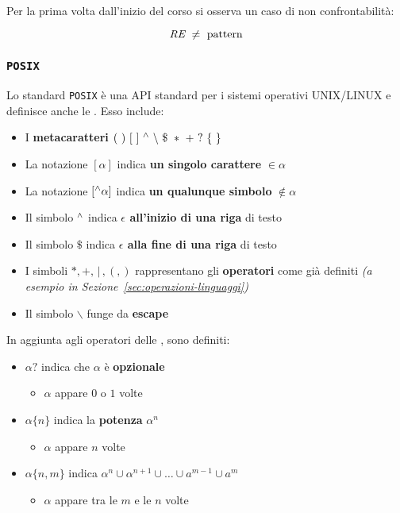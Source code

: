 \documentclass[italian, 10pt]{article}
\begin{document}
Per la prima volta dall'inizio del corso si osserva un caso di non confrontabilità:

\[ \textit{RE} \ \neq \text{ pattern} \]

\subsubsection{\RE \texttt{POSIX}}

Lo standard \texttt{POSIX} è una API standard per i sistemi operativi UNIX/LINUX e definisce anche le \RE.
Esso include:

\begin{itemize}
  \item I \textbf{metacaratteri} \(( \ ) \ [ \ ] \ \textsuperscript{$\wedge$} \ \backslash \ \$ \ \ast \ + \ ? \ \{ \ \}\)
  \item La notazione \([\alpha]\) indica \textbf{un singolo carattere} \(\in \alpha\)
  \item La notazione \([\textsuperscript{$\wedge$} \alpha]\) indica \textbf{un qualunque simbolo} \(\notin \alpha\)
  \item Il simbolo \(\textsuperscript{$\wedge$}\) indica \textbf{\(\epsilon\) all'inizio di una riga} di testo
  \item Il simbolo \(\$\) indica \textbf{\(\epsilon\) alla fine di una riga} di testo
  \item I simboli \(\ast, +, \, | \,, (, )\) rappresentano gli \textbf{operatori} come già definiti \textit{(a esempio in Sezione~\ref{sec:operazioni-linguaggi})}
  \item Il simbolo \(\backslash\) funge da \textbf{escape}
\end{itemize}

In aggiunta agli operatori delle \RE, sono definiti:
\begin{itemize}
  \item \(\alpha ?\) indica che \(\alpha\) è \textbf{opzionale}
        \begin{itemize}[label=\(\rightarrow\)]
          \item \(\alpha\) appare \(0\) o \(1\) volte
        \end{itemize}
  \item \(\alpha \{n\}\) indica la \textbf{potenza} \(\alpha^n\)
        \begin{itemize}[label=\(\rightarrow\)]
          \item \(\alpha\) appare \(n\) volte
        \end{itemize}
  \item \(\alpha\{n, m\}\) indica \(\alpha^n \cup \alpha^{n+1} \cup \ldots \cup a^{m-1} \cup a^m\)
        \begin{itemize}[label=\(\rightarrow\)]
          \item \(\alpha\) appare tra le \(m\) e le \(n\) volte
        \end{itemize}
\end{itemize}
\end{document}
